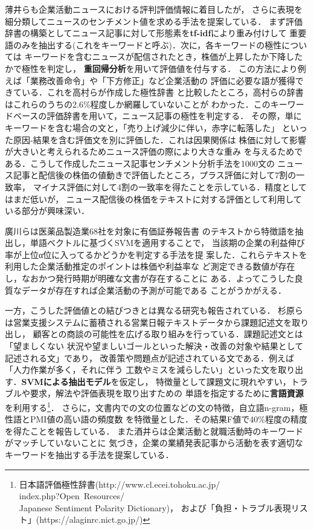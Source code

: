 \documentclass[twocolumn]{jarticle}
\begin{document}
薄井ら\cite{usui2014}も企業活動ニュースにおける評判評価情報に着目したが，
さらに表現を細分類してニュースのセンチメント値を求める手法を提案している．
まず評価辞書の構築としてニュース記事に対して形態素を{\bf tf-idf}により重み付けして
重要語のみを抽出する(これをキーワードと呼ぶ)．次に，各キーワードの極性については
キーワードを含むニュースが配信されたとき，株価が上昇したか下降したかで極性を判定し，
{\bf 重回帰分析}を用いて評価値を付与する．
この方法により例えば「業務改善命令」や「下方修正」など企業活動の
評価に必要な語が獲得できている．これを高村らが作成した極性辞書\cite{takamura05}
と比較したところ，高村らの辞書はこれらのうちの2.6\%程度しか網羅していないことが
わかった．このキーワードベースの評価辞書を用いて，ニュース記事の極性を判定する．
その際，単にキーワードを含む場合の文と，「売り上げ減少に伴い，赤字に転落した」
といった原因-結果を含む評価文を別に評価した．これは因果関係は
株価に対して影響が大きいと考えられるためニュース評価の際により大きな重み
を与えるためである．こうして作成したニュース記事センチメント分析手法を1000文の
ニュース記事と配信後の株価の値動きで評価したところ，プラス評価に対して7割の一致率，
マイナス評価に対して4割の一致率を得たことを示している．精度としてはまだ低いが，
ニュース配信後の株価をテキストに対する評価として利用している部分が興味深い．

廣川ら\cite{hirokawa2013}は医薬品製造業68社を対象に有価証券報告書
のテキストから特徴語を抽出し，単語ベクトルに基づくSVMを適用することで，
当該期の企業の利益伸び率が上位α位に入ってるかどうかを判定する手法を提
案した．これらテキストを利用した企業活動推定のポイントは株価や利益率な
ど測定できる数値が存在し，なおかつ発行時期が明確な文書が存在することに
ある．よってこうした良質なデータが存在すれば企業活動の予測が可能である
ことがうかがえる．

一方，こうした評価値との結びつきとは異なる研究も報告されている．
杉原ら\cite{sugihara2012}は営業支援システムに蓄積される営業日報テキストデータから課題記述文を取り出し，
顧客との商談の可能性を広げる取り組みを行っている．課題記述文とは「望ましくない
状況や望ましいゴールといった解決・改善の対象や結果として記述される文」であり，
改善策や問題点が記述されている文である．例えば「人力作業が多く，それに伴う
工数やミスを減らしたい」といった文を取り出す．{\bf SVMによる抽出モデル}を仮定し，
特徴量として課題文に現れやすい，トラブルや要求，解法や評価表現を取り出すための
単語を指定するために{\bf 言語資源}を利用する\footnote{日本語評価極性辞書(http://www.cl.ecei.tohoku.ac.jp/ \\
index.php?Open~Resources\slash{} \\ Japanese Sentiment  Polarity Dictionary)，
および「負担・トラブル表現リスト」(https://alaginrc.nict.go.jp/)}．
さらに，文書内での文の位置などの文の特徴，自立語n-gram，極性語とPMI値の高い語の頻度数
を特徴量とした．その結果F値で40\%程度の精度を得たことを報告している．
また酒井ら\cite{sakai2014}は企業活動と就職活動時のキーワードがマッチしていないことに
気づき，企業の業績発表記事から活動を表す適切なキーワードを抽出する手法を提案している．
\end{document}
